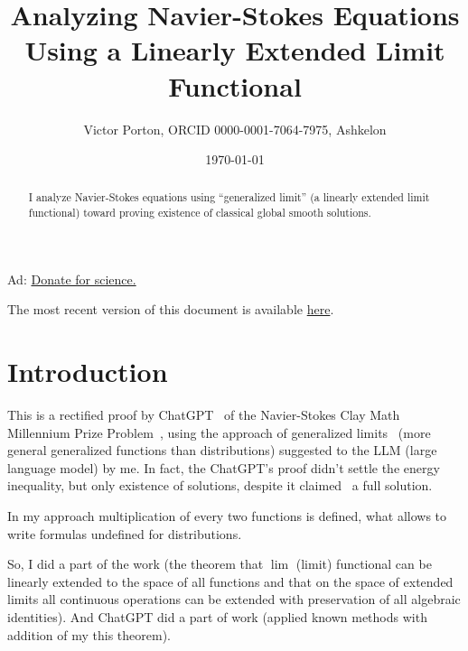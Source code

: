 \documentclass{amsart}
\begin{document}
\noindent
Ad: \href{https://science-dao.org}{Donate for science.}

The most recent version of this document is available \href{https://github.com/vporton/navier-stokes}{here}.

\title[Na\-vi\-er-Sto\-kes]{Analyzing Na\-vi\-er-Sto\-kes Equations Using a Linearly Extended Limit Functional}

\author{Victor Porton, ORCID 0000-0001-7064-7975, Ashkelon  }



\date{\today}

\begin{abstract}
I analyze Na\-vi\-er-Sto\-kes equations using ``generalized limit'' (a linearly extended limit functional) toward proving existence of classical global smooth solutions.
\end{abstract}


\maketitle

\section{Introduction}

This is a rectified proof by ChatGPT~\cite{navier-stokes-chat} of the Na\-vi\-er-Sto\-kes Clay Math Millennium Prize Problem~\cite{navier-stokes-clay}, using the approach of generalized limits~\cite{limit} (more general generalized functions than distributions) suggested to the LLM (large  language model) by me. In fact, the ChatGPT's proof didn't settle the energy inequality, but only existence of solutions, despite it claimed~\cite{navier-stokes-chat} a full solution.

In my approach multiplication of every two functions is defined, what allows to write formulas undefined for distributions.

So, I did a part of the work (the theorem that $\lim$ (limit) functional can be linearly extended to the space of all functions and that on the space of extended limits all continuous operations can be extended with preservation of all algebraic identities). And ChatGPT did a part of work (applied known methods with addition of my this theorem).
\end{document}
